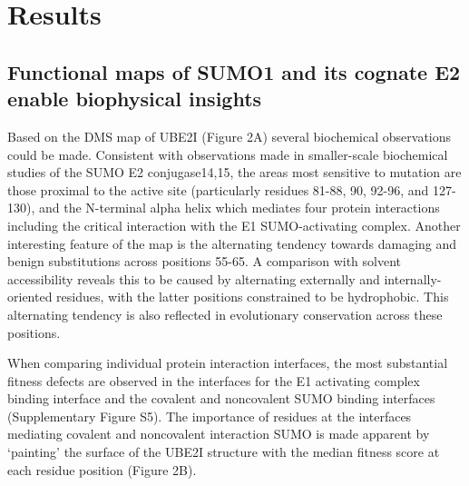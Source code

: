 \section{Results}

\subsection{Functional maps of SUMO1 and its cognate E2 enable biophysical insights}

Based on the DMS map of UBE2I (Figure 2A) several biochemical observations could be made. Consistent with observations made in smaller-scale biochemical studies of the SUMO E2 conjugase14,15, the areas most sensitive to mutation are those proximal to the active site (particularly residues 81-88, 90, 92-96, and 127-130), and the N-terminal alpha helix which mediates four protein interactions including the critical interaction with the E1 SUMO-activating complex. Another interesting feature of the map is the alternating tendency towards damaging and benign substitutions across positions 55-65. A comparison with solvent accessibility reveals this to be caused by alternating externally and internally-oriented residues, with the latter positions constrained to be hydrophobic. This alternating tendency is also reflected in evolutionary conservation across these positions.

When comparing individual protein interaction interfaces, the most substantial fitness defects are observed in the interfaces for the E1 activating complex binding interface and the  covalent and noncovalent SUMO binding interfaces  (Supplementary Figure S5).  The importance of residues at the interfaces mediating covalent and noncovalent interaction SUMO is made apparent by ‘painting’ the surface of the UBE2I structure with the median fitness score at each residue position (Figure 2B). 


